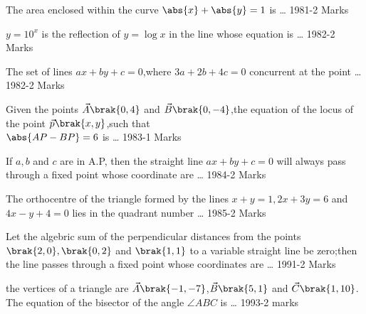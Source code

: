\iffalse
\title{Straight Lines and Pair of Straight Lines}
\author{EE24BTECH11041 - Mohit}
\section {fitb}
\fi
	\item The area enclosed within the curve $\abs{x}+\abs{y} =1$ is \dots
    \hfill{1981-2 Marks}
    \item $y = 10^x $ is the reflection of $y=\log x$ in the line whose equation is \dots
    \hfill{1982-2 Marks}
    \item The set of lines $ax+by+c=0$,where $3a+2b+4c=0$ concurrent at the point \dots
    \hfill{1982-2 Marks}
    \item Given the points $\vec{A}\brak{0,4}$ and $\vec{B}\brak{0,-4}$,the equation of the locus of the point $\vec{p}\brak{x,y}$,such that \\
    $\abs{AP-BP}=6$ is \dots
    \hfill{1983-1 Marks}
    \item If $a,b$ and $c$ are in A.P, then the straight line $ax +by +c=0$ will always pass through a fixed point whose coordinate are \dots
    \hfill{1984-2 Marks}
    \item The orthocentre of the triangle formed by the lines $x+y=1,2x +3y=6$ and $4x-y+4=0$ lies in the quadrant number \dots
    \hfill{1985-2 Marks}
    \item Let the algebric sum of the perpendicular distances from the points $\brak{2,0},\brak{0,2}$ and $\brak{1,1}$ to a variable straight line be zero;then the line passes through a fixed point whose coordinates are \dots
    \hfill{1991-2 Marks}
    \item the vertices of a triangle are $\vec{A}\brak{-1,-7}$,$\vec{B}\brak{5,1}$ and $\vec{C}\brak{1,10}$. The equation of the bisector of the angle $\angle{ABC}$ is \dots
    \hfill{1993-2 marks}


